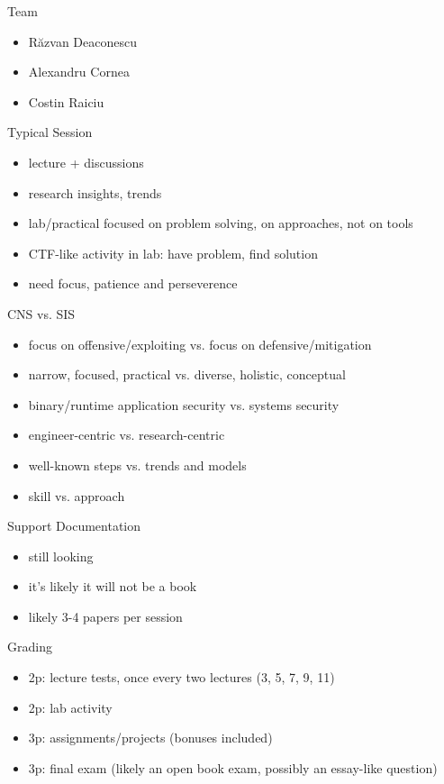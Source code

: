 \documentclass{curs}
\begin{document}
\begin{frame}{Team}
  \begin{itemize}
    \item Răzvan Deaconescu
    \item Alexandru Cornea
    \item Costin Raiciu
  \end{itemize}
\end{frame}

\begin{frame}{Typical Session}
  \begin{itemize}
    \item lecture + discussions
    \item research insights, trends
    \item lab/practical focused on problem solving, on approaches, not on tools
    \item CTF-like activity in lab: have problem, find solution
    \item need focus, patience and perseverence
  \end{itemize}
\end{frame}

\begin{frame}{CNS vs. SIS}
  \begin{itemize}
    \item focus on offensive/exploiting vs. focus on defensive/mitigation
    \item narrow, focused, practical vs. diverse, holistic, conceptual
    \item binary/runtime application security vs. systems security
    \item engineer-centric vs. research-centric
    \item well-known steps vs. trends and models
    \item skill vs. approach
  \end{itemize}
\end{frame}

\begin{frame}{Support Documentation}
  \begin{itemize}
    \item still looking
    \item it's likely it will not be a book
    \item likely 3-4 papers per session
  \end{itemize}
\end{frame}

\begin{frame}{Grading}
  \begin{itemize}
    \item 2p: lecture tests, once every two lectures (3, 5, 7, 9, 11)
    \item 2p: lab activity
    \item 3p: assignments/projects (bonuses included)
    \item 3p: final exam (likely an open book exam, possibly an essay-like question)
  \end{itemize}
\end{frame}
\end{document}
